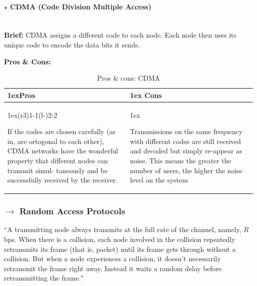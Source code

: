 \paragraph[5.3.1.3 CDMA]{$\pmb{\star}$ CDMA (Code Division Multiple Access)}\mbox{}\\[4pt]
\noindent \textbf{Brief:} CDMA assigns a different code to each node. Each node then uses its unique code to encode the data bits it sends.

\vspace{1em}
\noindent \textbf{Pros \& Cons:}
\begin{table}[H]
    \begin{tabularx}{\linewidth}{>{\parskip1ex}X@{\kern4\tabcolsep}>{\parskip1ex}X}
    \toprule
    \hfil\bfseries Pros
    &
    \hfil\bfseries Cons 
    \\\cmidrule(r{3\tabcolsep}){1-1}\cmidrule(l{-\tabcolsep}){2-2}
    
     If the codes are chosen carefully (as in, are ortogonal to each other), CDMA networks have the wonderful property that different nodes can transmit simul- taneously and be successfully received by the receiver.
    &
    
    Transmissions on the same frequency with different codes are still received and decoded but simply re-appear as noise. This means the greater the number of users, the higher the noise level on the system
    \\\bottomrule
    \end{tabularx}
    \caption{Pros \& cons: CDMA}
\end{table}

\clearpage
\subsubsection[5.3.2 Random Access Protocols]{$\rightarrow$ Random Access Protocols}
\label{subsec:random-access-protocols}

\begin{mdframed}
    ``A transmitting node always transmits at the full rate of the channel, namely, $R$ bps. When there is a collision, each node involved in the collision repeatedly retransmits its frame (that is, packet) until its frame gets through without a collision. But when a node experiences a collision, it doesn’t necessarily retransmit the frame right away. Instead it waits a random delay before retransmitting the frame."\cite{Kurose2017}
\end{mdframed}%

